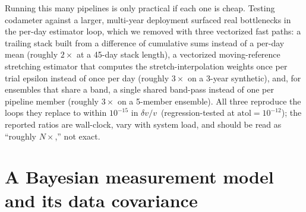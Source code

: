 \documentclass[
  referee]{gji}
\providecommand{\dvv}{\ensuremath{\delta v/v}}
\begin{document}
Running this many pipelines is only practical if each one is cheap.
Testing codameter against a larger, multi-year deployment surfaced real
bottlenecks in the per-day estimator loop, which we removed with three
vectorized fast paths: a trailing stack built from a difference of
cumulative sums instead of a per-day mean (roughly \(2\times\) at a
45-day stack length), a vectorized moving-reference stretching estimator
that computes the stretch-interpolation weights once per trial epsilon
instead of once per day (roughly \(3\times\) on a 3-year synthetic),
and, for ensembles that share a band, a single shared band-pass instead
of one per pipeline member (roughly \(3\times\) on a 5-member ensemble).
All three reproduce the loops they replace to within \(10^{-15}\) in
\dvv~(regression-tested at \(\mathrm{atol}=10^{-12}\)); the reported
ratios are wall-clock, vary with system load, and should be read as
``roughly \(N\times\),'' not exact.

\section{A Bayesian measurement model and its data
covariance}\label{sec:bayes}
\end{document}
